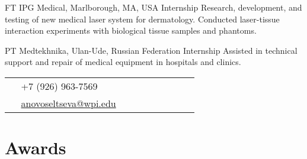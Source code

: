 \documentclass[10pt]{article} %
\begin{document}
\begin{paracol}{2}
{FT} %
{IPG Medical, Marlborough, MA, USA} %
{Internship} %
{Research, development, and testing of new medical laser system for dermatology. Conducted laser-tissue interaction experiments with biological tissue samples and phantoms.}  %


{PT} %
{Medtekhnika, Ulan-Ude, Russian Federation} %
{Internship} %
{Assisted in technical support and repair of medical equipment in hospitals and clinics.} %


\vspace{-\baselineskip}\medskip %


\switchcolumn %


\parbox[top][0.06\textheight][c]{\linewidth}{ %
	\vspace{-0.04\textheight} %
	\colorbox{shade}{ %
		\begin{supertabular}{p{0.05\linewidth}|p{0.775\linewidth}} %
			\raisebox{-1pt}{\faPhone} & +7 (926) 963-7569 \\ %
			\raisebox{0pt}{\small\faEnvelope} & \href{mailto:anovoseltseva@wpi.edu}{anovoseltseva@wpi.edu} \\ 
		\end{supertabular}
	}
}


\section{Awards}


\end{paracol}
\end{document}

